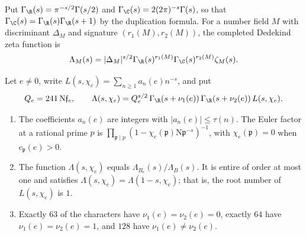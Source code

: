 Put $\Gamma_\R(s)=\pi^{-s/2}\Gamma(s/2)$ and
$\Gamma_\C(s)=2(2\pi)^{-s}\Gamma(s)$, so that
$\Gamma_\C(s)=\Gamma_\R(s)\Gamma_\R(s+1)$ by the duplication formula. For a
number field $M$ with discriminant $\Delta_M$ and signature
$(r_1(M),r_2(M))$, the completed Dedekind zeta function is
\[
 \Lambda_M(s)=|\Delta_M|^{s/2}\Gamma_\R(s)^{r_1(M)}\Gamma_\C(s)^{r_2(M)}
 \zeta_M(s).
\]

\begin{proposition}\label{gf:degree-two}
Let $e\ne0$, write $L(s,\chi_e)=\sum_{n\ge1}a_n(e)n^{-s}$, and put
\[
 Q_e=241\,\mathrm N\mathfrak f_e,\qquad
 \Lambda(s,\chi_e)=Q_e^{s/2}\,\Gamma_\R(s+\nu_1(e))\,\Gamma_\R(s+\nu_2(e))\,
 L(s,\chi_e).
\]
\begin{enumerate}
\item The coefficients $a_n(e)$ are integers with $|a_n(e)|\le\tau(n)$. The
 Euler factor at a rational prime $p$ is
 $\prod_{\mathfrak p\mid p}(1-\chi_e(\mathfrak p)\mathrm N\mathfrak p^{-s})^{-1}$,
 with $\chi_e(\mathfrak p)=0$ when $c_{\mathfrak p}(e)>0$.
\item The function $\Lambda(s,\chi_e)$ equals $\Lambda_{B_e}(s)/\Lambda_B(s)$.
 It is entire of order at most one and satisfies
 $\Lambda(s,\chi_e)=\Lambda(1-s,\chi_e)$; that is, the root number of
 $L(s,\chi_e)$ is $1$.
\item Exactly $63$ of the characters have $\nu_1(e)=\nu_2(e)=0$, exactly
 $64$ have $\nu_1(e)=\nu_2(e)=1$, and $128$ have $\nu_1(e)\ne\nu_2(e)$.
\end{enumerate}
\end{proposition}


